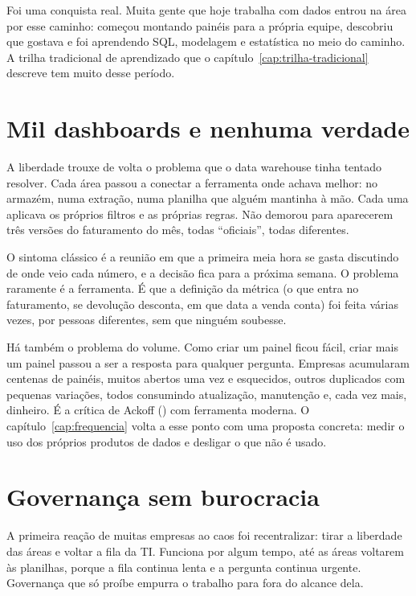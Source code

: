 Foi uma conquista real. Muita gente que hoje trabalha com dados entrou na área por esse
caminho: começou montando painéis para a própria equipe, descobriu que gostava e foi
aprendendo SQL, modelagem e estatística no meio do caminho. A trilha tradicional de
aprendizado que o capítulo~\ref{cap:trilha-tradicional} descreve tem muito desse
período.

\section{Mil dashboards e nenhuma verdade}
\label{sec:mil-dashboards}

A liberdade trouxe de volta o problema que o data warehouse tinha tentado resolver. Cada
área passou a conectar a ferramenta onde achava melhor: no armazém, numa extração, numa
planilha que alguém mantinha à mão. Cada uma aplicava os próprios filtros e as próprias
regras. Não demorou para aparecerem três versões do faturamento do mês, todas
\enquote{oficiais}, todas diferentes.

O sintoma clássico é a reunião em que a primeira meia hora se gasta discutindo de onde
veio cada número, e a decisão fica para a próxima semana. O problema raramente é a
ferramenta. É que a definição da métrica (o que entra no faturamento, se devolução
desconta, em que data a venda conta) foi feita várias vezes, por pessoas diferentes, sem
que ninguém soubesse.

Há também o problema do volume. Como criar um painel ficou fácil, criar mais um painel
passou a ser a resposta para qualquer pergunta. Empresas acumularam centenas de painéis,
muitos abertos uma vez e esquecidos, outros duplicados com pequenas variações, todos
consumindo atualização, manutenção e, cada vez mais, dinheiro. É a crítica de Ackoff
() com ferramenta moderna. O capítulo~\ref{cap:frequencia} volta a esse
ponto com uma proposta concreta: medir o uso dos próprios produtos de dados e desligar o
que não é usado.


\section{Governança sem burocracia}
\label{sec:governanca}

A primeira reação de muitas empresas ao caos foi recentralizar: tirar a liberdade das
áreas e voltar a fila da TI. Funciona por algum tempo, até as áreas voltarem às
planilhas, porque a fila continua lenta e a pergunta continua urgente. Governança que só
proíbe empurra o trabalho para fora do alcance dela.

